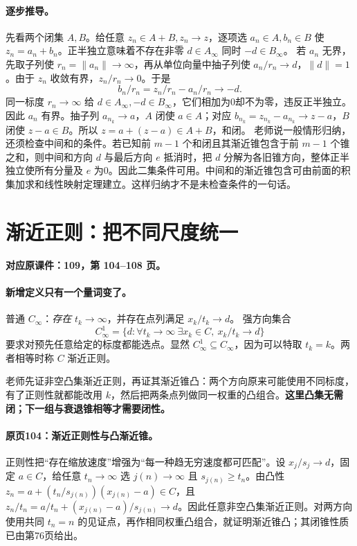 \documentclass[11pt,a4paper]{article}
\theoremstyle{definition}\newtheorem{definition}{定义}\newtheorem{example}{例}
\begin{document}
\paragraph{逐步推导。}
先看两个闭集 $A,B$。给任意 $z_n\in A+B,z_n\to z$，逐项选 $a_n\in A,b_n\in B$ 使 $z_n=a_n+b_n$。正半独立意味着不存在非零 $d\in A_\infty$ 同时 $-d\in B_\infty$。
若 $a_n$ 无界，先取子列使 $r_n=\|a_n\|\to\infty$，再从单位向量中抽子列使 $a_n/r_n\to d$，$\|d\|=1$。由于 $z_n$ 收敛有界，$z_n/r_n\to0$。于是
\[b_n/r_n=z_n/r_n-a_n/r_n\to-d.\]
同一标度 $r_n\to\infty$ 给 $d\in A_\infty,-d\in B_\infty$，它们相加为0却不为零，违反正半独立。因此 $a_n$ 有界。抽子列 $a_{n_k}\to a$，$A$ 闭使 $a\in A$；对应 $b_{n_k}=z_{n_k}-a_{n_k}\to z-a$，$B$ 闭使 $z-a\in B$。所以 $z=a+(z-a)\in A+B$，和闭。
老师说一般情形归纳，还须检查中间和的条件。若已知前 $m-1$ 个和闭且其渐近锥包含于前 $m-1$ 个锥之和，则中间和方向 $d$ 与最后方向 $e$ 抵消时，把 $d$ 分解为各旧锥方向，整体正半独立使所有分量及 $e$ 为0。因此二集条件可用。中间和的渐近锥包含可由前面的积集加求和线性映射定理建立。这样归纳才不是未检查条件的一句话。


\clearpage\section{渐近正则：把不同尺度统一}\label{g:109:104}

\textbf{对应原课件：109，第 104--108 页。}


\paragraph{新增定义只有一个量词变了。}
普通 $C_\infty$：\emph{存在} $t_k\to\infty$，并存在点列满足 $x_k/t_k\to d$。
强方向集合
\[C^1_\infty=\{d:\forall t_k\to\infty\ \exists x_k\in C,
\ x_k/t_k\to d\}
\]
要求对预先任意给定的标度都能选点。显然 $C^1_\infty\subseteq C_\infty$，因为可以特取 $t_k=k$。两者相等时称 $C$ 渐近正则。

老师先证非空凸集渐近正则，再证其渐近锥凸：两个方向原来可能使用不同标度，有了正则性就都能改用 $k$，然后把两条点列做同一权重的凸组合。\textbf{这里凸集无需闭；下一组与衰退锥相等才需要闭性。}


\paragraph{原页104：渐近正则性与凸渐近锥。}正则性把“存在缩放速度”增强为“每一种趋无穷速度都可匹配”。设 $x_j/s_j\to d$，固定 $a\in C$，给任意 $t_n\to\infty$ 选 $j(n)\to\infty$ 且 $s_{j(n)}\ge t_n$。由凸性 $z_n=a+(t_n/s_{j(n)})(x_{j(n)}-a)\in C$，且 $z_n/t_n=a/t_n+(x_{j(n)}-a)/s_{j(n)}\to d$。因此任意非空凸集渐近正则。对两方向使用共同 $t_n=n$ 的见证点，再作相同权重凸组合，就证明渐近锥凸；其闭锥性质已由第76页给出。
\end{document}
